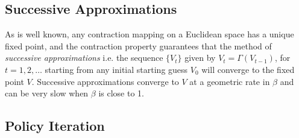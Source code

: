 \subsection{Successive Approximations}

As is well known, any contraction mapping on a Euclidean space has a unique fixed point, and the contraction property guarantees that the
method of {\it successive approximations\/} i.e. the sequence $\{V_t\}$ given by $V_{t}=\Gamma(V_{t-1})$, for $t=1,2,\ldots$ starting from
any initial starting guess $V_0$ will converge to the fixed point $V$.
Successive approximations converge to $V$ at a geometric rate in $\beta$  and can be very slow when $\beta$ is close to 1. 

\subsection{Policy Iteration}

